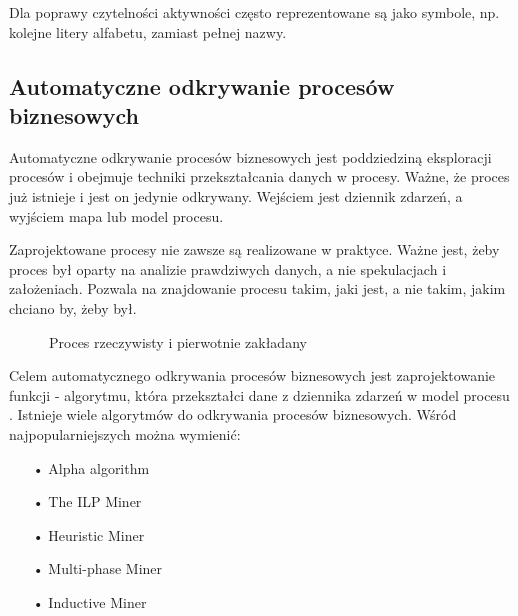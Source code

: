 Dla poprawy czytelności aktywności często reprezentowane są jako symbole, np. kolejne litery alfabetu, zamiast pełnej nazwy.

\subsection{Automatyczne odkrywanie procesów biznesowych}
\label{sec:discovery}

Automatyczne odkrywanie procesów biznesowych jest poddziedziną eksploracji procesów i obejmuje techniki przekształcania danych w procesy. Ważne, że proces już istnieje i jest on jedynie odkrywany. Wejściem jest dziennik zdarzeń, a wyjściem mapa lub model procesu.

Zaprojektowane procesy nie zawsze są realizowane w praktyce. Ważne jest, żeby proces był oparty na analizie prawdziwych danych, a nie spekulacjach i założeniach. Pozwala na znajdowanie procesu takim, jaki jest, a nie takim, jakim chciano by, żeby był.

\begin{figure}[h]
	\caption{\label{fig:subcaption_example}Proces rzeczywisty i pierwotnie zakładany}
\end{figure}

Celem automatycznego odkrywania procesów biznesowych jest zaprojektowanie funkcji - algorytmu, która przekształci dane z dziennika zdarzeń w model procesu \cite{pm-book}. Istnieje wiele algorytmów do odkrywania procesów biznesowych. Wśród najpopularniejszych można wymienić:
\begin{itemize}
  \item[•] Alpha algorithm \cite{alpha-algorithm}
  \item[•] The ILP Miner \cite{ILP-miner}
  \item[•] Heuristic Miner \cite{heuristics-miner}
  \item[•] Multi-phase Miner \cite{multi-phase-miner}
  \item[•] Inductive Miner \cite{inductive-miner}
\end{itemize}

